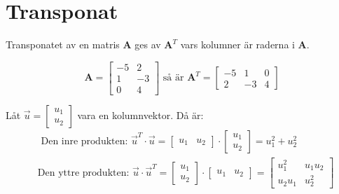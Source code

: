 \section{Transponat} %
\label{sec:transponat}
\begin{Def}
    Transponatet av en matris \textbf{A} ges av $\mathbf{A}^T$ vars kolumner är raderna i \textbf{A}.
\end{Def}
\begin{Ex}
    \[
        \mathbf{A} = \begin{bmatrix} -5&2\\1&-3\\0&4 \end{bmatrix} \mbox{ så är } \mathbf{A}^T = \begin{bmatrix} -5&1&0\\2&-3&4 \end{bmatrix}
    \]
\end{Ex}
\begin{Ex}
    Låt $\vec{u} = \begin{bmatrix} u_1\\u_2 \end{bmatrix}$ vara en kolumnvektor. Då är:
    \begin{align*}
    	&\mbox{ Den inre produkten: } \vec{u}^T \cdot \vec{u} = \begin{bmatrix} u_1&u_2 \end{bmatrix} \cdot \begin{bmatrix} u_1\\u_2 \end{bmatrix} = u^2_1 + u^2_2\\
    	&\mbox{Den yttre produkten: } \vec{u} \cdot \vec{u}^T = \begin{bmatrix} u_1\\u_2 \end{bmatrix} \cdot \begin{bmatrix} u_1&u_2 \end{bmatrix} = \begin{bmatrix} u^2_1&u_1u_2\\u_2u_1&u^2_2 \end{bmatrix}
    \end{align*}
\end{Ex}
